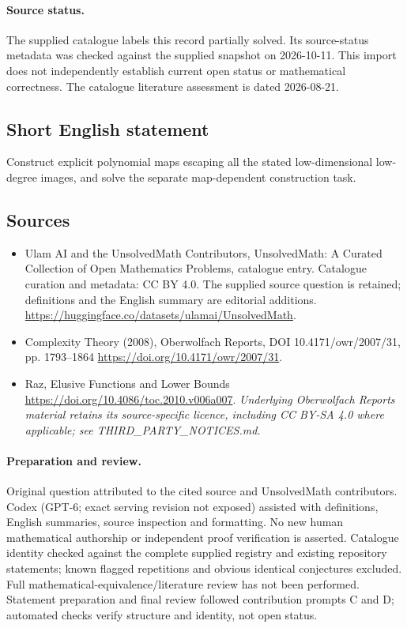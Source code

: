 \documentclass[11pt]{article}
\begin{document}
\paragraph{Source status.}
The supplied catalogue labels this record partially solved. Its source-status metadata was checked against the supplied snapshot on 2026-10-11. This import does not independently establish current open status or mathematical correctness. The catalogue literature assessment is dated 2026-08-21.
\subsection{Short English statement}
Construct explicit polynomial maps escaping all the stated low-dimensional low-degree images, and solve the separate map-dependent construction task.
\subsection{Sources}
\begin{itemize}
\item[\hypertarget{source:statement:1}{S1}] Ulam AI and the UnsolvedMath Contributors, UnsolvedMath: A Curated Collection of Open Mathematics Problems, catalogue entry. Catalogue curation and metadata: CC BY 4.0. The supplied source question is retained; definitions and the English summary are editorial additions.
\url{https://huggingface.co/datasets/ulamai/UnsolvedMath}.
\item[\hypertarget{source:statement:2}{S2}] Complexity Theory (2008), Oberwolfach Reports, DOI 10.4171/owr/2007/31, pp. 1793--1864
\url{https://doi.org/10.4171/owr/2007/31}.
\item[\hypertarget{source:statement:3}{S3}] Raz, Elusive Functions and Lower Bounds
\url{https://doi.org/10.4086/toc.2010.v006a007}.
\textit{Underlying Oberwolfach Reports material retains its source-specific licence, including CC BY-SA 4.0 where applicable; see THIRD\_PARTY\_NOTICES.md.}
\end{itemize}
\paragraph{Preparation and review.}
Original question attributed to the cited source and UnsolvedMath contributors. Codex (GPT-6; exact serving revision not exposed) assisted with definitions, English summaries, source inspection and formatting. No new human mathematical authorship or independent proof verification is asserted. Catalogue identity checked against the complete supplied registry and existing repository statements; known flagged repetitions and obvious identical conjectures excluded. Full mathematical-equivalence/literature review has not been performed. Statement preparation and final review followed contribution prompts C and D; automated checks verify structure and identity, not open status.
\label{end:statement}
\end{document}
